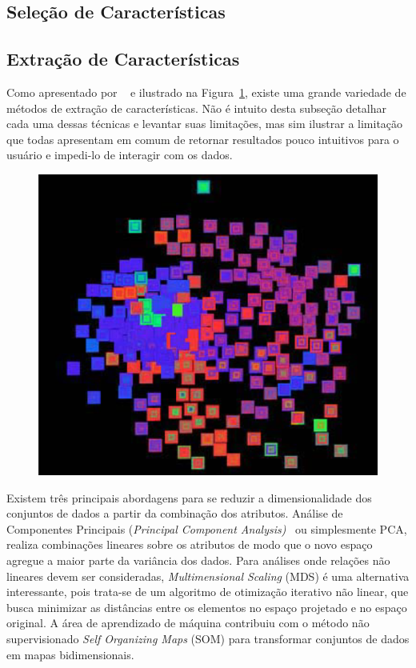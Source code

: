 \subsection{Seleção de Características}

\subsection{Extração de Características}

Como apresentado por \citeauthor{Maaten2009}~\cite{Maaten2009} e ilustrado na Figura~\ref{fig:fex}, existe uma grande variedade de métodos de extração de características. Não é intuito desta subseção detalhar cada uma dessas técnicas e levantar suas limitações, mas sim ilustrar a limitação que todas apresentam em comum de retornar resultados pouco intuitivos para o usuário e impedi-lo de interagir com os dados.

\begin{figure}[h!]
    \centering
    \includegraphics[width=\textwidth]{images/var1.png}
    \caption[]{}
    \label{fig:fex}
\end{figure}


Existem três principais abordagens para se reduzir a dimensionalidade dos conjuntos de dados a partir da combinação dos atributos. 
Análise de Componentes Principais (\textit{Principal Component Analysis)}~ ou simplesmente PCA, realiza combinações lineares sobre os atributos de modo que o novo espaço agregue a maior parte da variância dos dados. 
Para análises onde relações não lineares devem ser consideradas, \textit{Multimensional Scaling} (MDS) é uma alternativa interessante, pois trata-se de um algoritmo de otimização iterativo não linear, que busca minimizar as distâncias entre os elementos no espaço projetado e no espaço original. 
A área de aprendizado de máquina contribuiu com o método não supervisionado \textit{Self Organizing Maps} (SOM) para transformar conjuntos de dados em mapas bidimensionais.

